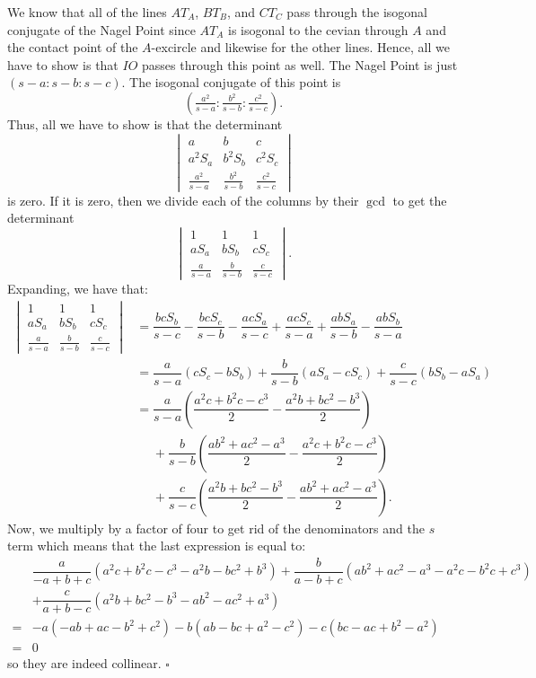 \documentclass{article}
\begin{document}
We know that all of the lines $AT_A$, $BT_B$, and $CT_C$ pass through the isogonal conjugate of the Nagel Point since $AT_A$ is isogonal to the cevian through $A$ and the contact point of the $A$-excircle and likewise for the other lines. Hence, all we have to show is that $IO$ passes through this point as well. The Nagel Point is just $\left(s-a : s-b : s-c\right)$. The isogonal conjugate of this point is \[\left(\tfrac{a^2}{s-a} : \tfrac{b^2}{s-b} : \tfrac{c^2}{s-c}\right).\] Thus, all we have to show is that the determinant \[\begin{vmatrix}a&b&c\\a^2S_a&b^2S_b&c^2S_c\\\tfrac{a^2}{s-a}&\tfrac{b^2}{s-b}&\tfrac{c^2}{s-c}\end{vmatrix}\] is zero. If it is zero, then we divide each of the columns by their $\gcd$ to get the determinant \[\begin{vmatrix}1&1&1\\aS_a&bS_b&cS_c\\\tfrac{a}{s-a}&\tfrac{b}{s-b}&\tfrac{c}{s-c}\end{vmatrix}.\] Expanding, we have that:
\begin{align*}
\begin{vmatrix}1&1&1\\aS_a&bS_b&cS_c\\\tfrac{a}{s-a}&\tfrac{b}{s-b}&\tfrac{c}{s-c}\end{vmatrix} &= \dfrac{bcS_b}{s-c}-\dfrac{bcS_c}{s-b}-\dfrac{acS_a}{s-c}+\dfrac{acS_c}{s-a}+\dfrac{abS_a}{s-b}-\dfrac{abS_b}{s-a} \\
&= \dfrac{a}{s-a}(cS_c-bS_b)+\dfrac{b}{s-b}(aS_a-cS_c)+\dfrac{c}{s-c}(bS_b-aS_a) \\
&= \dfrac{a}{s-a}\left(\dfrac{a^2c+b^2c-c^3}{2}-\dfrac{a^2b+bc^2-b^3}{2}\right) \\
&\phantom{=}+\dfrac{b}{s-b}\left(\dfrac{ab^2+ac^2-a^3}{2}-\dfrac{a^2c+b^2c-c^3}{2}\right) \\
&\phantom{=}+\dfrac{c}{s-c}\left(\dfrac{a^2b+bc^2-b^3}{2}-\dfrac{ab^2+ac^2-a^3}{2}\right).
\end{align*}
Now, we multiply by a factor of four to get rid of the denominators and the $s$ term which means that the last expression is equal to:
\begin{align*}
&\dfrac{a}{-a+b+c}(a^2c+b^2c-c^3-a^2b-bc^2+b^3)+\dfrac{b}{a-b+c}(ab^2+ac^2-a^3-a^2c-b^2c+c^3) \\
&+\dfrac{c}{a+b-c}(a^2b+bc^2-b^3-ab^2-ac^2+a^3) \\
= &-a(-ab+ac-b^2+c^2)-b(ab-bc+a^2-c^2)-c(bc-ac+b^2-a^2) \\
= &0
\end{align*}
so they are indeed collinear. $\square$
\end{document}
